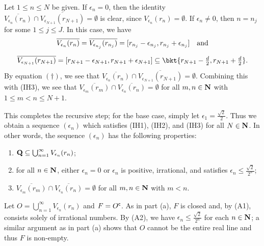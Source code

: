 \documentclass{lew98_solutions}
\begin{document}
\begin{solution}
\begin{enumerate}
\begin{description}
            Let \( 1 \leq n \leq N \) be given. If \( \epsilon_n = 0 \), then the identity \( \overline{V_{\epsilon_n}(r_n)} \cap \overline{V_{\epsilon_{N+1}}(r_{N+1})} = \emptyset \) is clear, since \( V_{\epsilon_n}(r_n) = \emptyset \). If \( \epsilon_n \neq 0 \), then \( n = n_j \) for some \( 1 \leq j \leq J \). In this case, we have
            \begin{multline*}
                \overline{V_{\epsilon_n}(r_n)} = \overline{V_{\epsilon_{n_j}}(r_{n_j})} = [r_{n_j} - \epsilon_{n_j}, r_{n_j} + \epsilon_{n_j}] \quad \text{and} \\[2mm]
                \overline{V_{\epsilon_{N+1}}(r_{N+1})} = [r_{N+1} - \epsilon_{N+1}, r_{N+1} + \epsilon_{N+1}] \subseteq \bkt{ r_{N+1} - \tfrac{d}{2}, r_{N+1} + \tfrac{d}{2} }.
            \end{multline*}
            By equation \( (\dag) \), we see that \( \overline{V_{\epsilon_n}(r_n)} \cap \overline{V_{\epsilon_{N+1}}(r_{N+1})} = \emptyset \). Combining this with (IH3), we see that \( \overline{V_{\epsilon_m}(r_m)} \cap \overline{V_{\epsilon_n}(r_n)} = \emptyset \) for all \( m, n \in \mathbf{N} \) with \( 1 \leq m < n \leq N + 1 \).
        \end{description}
        This completes the recursive step; for the base case, simply let \( \epsilon_1 = \tfrac{\sqrt{2}}{2} \). Thus we obtain a sequence \( (\epsilon_n) \) which satisfies (IH1), (IH2), and (IH3) for all \( N \in \mathbf{N} \). In other words, the sequence \( (\epsilon_n) \) has the following properties:
        \begin{enumerate}[itemsep=8pt, leftmargin=44pt, label=(A\arabic*)]
            \item \( \mathbf{Q} \subseteq \bigcup_{n=1}^{\infty} V_{\epsilon_n}(r_n) \);

            \item for all \( n \in \mathbf{N} \), either \( \epsilon_n = 0 \) or \( \epsilon_n \) is positive, irrational, and satisfies \( \epsilon_n \leq \tfrac{\sqrt{2}}{2^n} \);

            \item \( \overline{V_{\epsilon_m}(r_m)} \cap \overline{V_{\epsilon_n}(r_n)} = \emptyset \) for all \( m, n \in \mathbf{N} \) with \( m < n \).
        \end{enumerate}
        Let \( O = \bigcup_{n=1}^{\infty} V_{\epsilon_n}(r_n) \) and \( F = O^{\mathsf{c}} \). As in part (a), \( F \) is closed and, by (A1), consists solely of irrational numbers. By (A2), we have \( \epsilon_n \leq \tfrac{\sqrt{2}}{2^n} \) for each \( n \in \mathbf{N} \); a similar argument as in part (a) shows that \( O \) cannot be the entire real line and thus \( F \) is non-empty.
        

\end{enumerate}
\end{solution}
\end{document}
